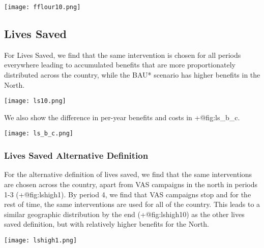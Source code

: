 \documentclass[
]{article}
\let\origfigure=\figure
\let\endorigfigure=\endfigure
\renewenvironment{figure}[1][]{%
    \origfigure[H]
}{%
    \endorigfigure
}
\begin{document}
\begin{figure}
\hypertarget{fig:fflour10}{%
\centering
\texttt{[image: fflour10.png]}
\caption{Folic Acid Accumulated Benefits, T=10}\label{fig:fflour10}
}
\end{figure}

\hypertarget{lives-saved}{%
\subsection{Lives Saved}\label{lives-saved}}

For Lives Saved, we find that the same intervention is chosen for all
periods everywhere leading to accumulated benefits that are more
proportionately distributed across the country, while the BAU* scenario
has higher benefits in the North.

\begin{figure}
\hypertarget{fig:ls10}{%
\centering
\texttt{[image: ls10.png]}
\caption{Lives Saved Accumulated Benefits, T=10}\label{fig:ls10}
}
\end{figure}

We also show the difference in per-year benefits and costs in
+@fig:ls\_b\_c.

\begin{figure}
\hypertarget{fig:ls_b_c}{%
\centering
\texttt{[image: ls\_b\_c.png]}
\caption{Lives Saved Per-Year Benefits and Costs}\label{fig:ls_b_c}
}
\end{figure}

\hypertarget{lives-saved-alternative-definition}{%
\subsubsection{Lives Saved Alternative
Definition}\label{lives-saved-alternative-definition}}

For the alternative definition of lives saved, we find that the same
interventions are chosen across the country, apart from VAS campaigns in
the north in periods 1-3 (+@fig:lshigh1). By period 4, we find that VAS
campaigns stop and for the rest of time, the same interventions are used
for all of the country. This leads to a similar geographic distribution
by the end (+@fig:lshigh10) as the other lives saved definition, but
with relatively higher benefits for the North.

\begin{figure}
\hypertarget{fig:lshigh1}{%
\centering
\texttt{[image: lshigh1.png]}
\caption{Lives Saved Alternative Specification Accumulated Benefits,
T=1}\label{fig:lshigh1}
}
\end{figure}
\end{document}
